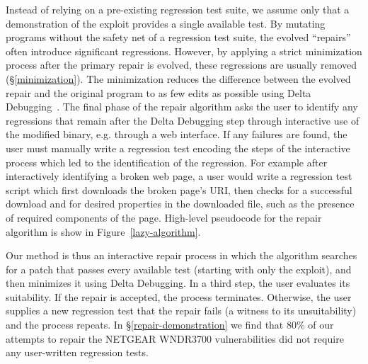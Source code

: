\documentclass{sig-alternate}
\begin{document}
Instead of relying on a pre-existing regression test suite, we assume
only that a demonstration of the exploit provides a single available
test.  By mutating programs without the safety net of a regression
test suite, the evolved ``repairs'' often introduce significant
regressions.  However, by applying a strict minimization process after
the primary repair is evolved, these regressions are usually
removed (\S\ref{minimization}).  The minimization reduces the
difference between the evolved repair and the original program to as
few edits as possible using Delta Debugging~\cite{delta}.  The final
phase of the repair algorithm asks the user to identify any
regressions that remain after the Delta Debugging step through
interactive use of the modified binary, e.g. through a web interface.
If any failures are found, the user must manually write a regression
test encoding the steps of the interactive process which led to the
identification of the regression.  For example after interactively
identifying a broken web page, a user would write a regression test
script which first downloads the broken page's URI, then checks for a
successful download and for desired properties in the downloaded file,
such as the presence of required components of the page.  High-level
pseudocode for the repair algorithm is show in
Figure~\ref{lazy-algorithm}.

Our method is thus an interactive repair process in which the
algorithm searches for a patch that passes every available test
(starting with only the exploit), and then minimizes it using Delta
Debugging.  In a third step, the user evaluates its suitability.  If
the repair is accepted, the process terminates. Otherwise, the user
supplies a new regression test that the repair fails (a witness to its
unsuitability) and the process repeats.  In
\S\ref{repair-demonstration} we find that 80\% of our attempts to
repair the NETGEAR WNDR3700 vulnerabilities did not require any
user-written regression tests.
\end{document}
